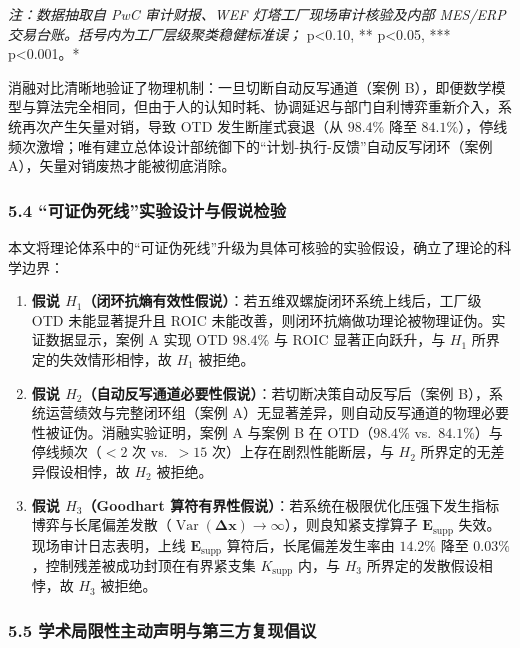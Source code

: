 \documentclass[
]{article}
\providecommand{\tightlist}{%
  \setlength{\itemsep}{0pt}\setlength{\parskip}{0pt}}
\begin{document}
\emph{注：数据抽取自 PwC 审计财报、WEF 灯塔工厂现场审计核验及内部
MES/ERP 交易台账。括号内为工厂层级聚类稳健标准误；} p\textless0.10, **
p\textless0.05, *** p\textless0.001。*

消融对比清晰地验证了物理机制：一旦切断自动反写通道（案例
B），即便数学模型与算法完全相同，但由于人的认知时耗、协调延迟与部门自利博弈重新介入，系统再次产生矢量对销，导致
OTD 发生断崖式衰退（从 \(98.4\%\) 降至
\(84.1\%\)），停线频次激增；唯有建立总体设计部统御下的``计划-执行-反馈''自动反写闭环（案例
A），矢量对销废热才能被彻底消除。

\subsubsection{5.4
``可证伪死线''实验设计与假说检验}\label{ux53efux8bc1ux4f2aux6b7bux7ebfux5b9eux9a8cux8bbeux8ba1ux4e0eux5047ux8bf4ux68c0ux9a8c}

本文将理论体系中的``可证伪死线''升级为具体可核验的实验假设，确立了理论的科学边界：

\begin{enumerate}
\def\labelenumi{\arabic{enumi}.}
\tightlist
\item
  \textbf{假说
  \(H_1\)（闭环抗熵有效性假说）}：若五维双螺旋闭环系统上线后，工厂级 OTD
  未能显著提升且 ROIC
  未能改善，则闭环抗熵做功理论被物理证伪。实证数据显示，案例 A 实现 OTD
  \(98.4\%\) 与 ROIC 显著正向跃升，与 \(H_1\) 所界定的失效情形相悖，故
  \(H_1\) 被拒绝。
\item
  \textbf{假说
  \(H_2\)（自动反写通道必要性假说）}：若切断决策自动反写后（案例
  B），系统运营绩效与完整闭环组（案例
  A）无显著差异，则自动反写通道的物理必要性被证伪。消融实验证明，案例 A
  与案例 B 在 OTD（\(98.4\%\) vs.~\(84.1\%\)）与停线频次（\(<2\) 次
  vs.~\(>15\) 次）上存在剧烈性能断层，与 \(H_2\)
  所界定的无差异假设相悖，故 \(H_2\) 被拒绝。
\item
  \textbf{假说 \(H_3\)（Goodhart
  算符有界性假说）}：若系统在极限优化压强下发生指标博弈与长尾偏差发散（\(\operatorname{Var}(\mathbf{\Delta}\mathbf{x}) \to \infty\)），则良知紧支撑算子
  \(\mathbf{E}_{\mathrm{supp}}\) 失效。现场审计日志表明，上线
  \(\mathbf{E}_{\mathrm{supp}}\) 算符后，长尾偏差发生率由 \(14.2\%\)
  降至 \(0.03\%\)，控制残差被成功封顶在有界紧支集 \(K_{\text{supp}}\)
  内，与 \(H_3\) 所界定的发散假设相悖，故 \(H_3\) 被拒绝。
\end{enumerate}

\subsubsection{5.5
学术局限性主动声明与第三方复现倡议}\label{ux5b66ux672fux5c40ux9650ux6027ux4e3bux52a8ux58f0ux660eux4e0eux7b2cux4e09ux65b9ux590dux73b0ux5021ux8bae}
\end{document}
